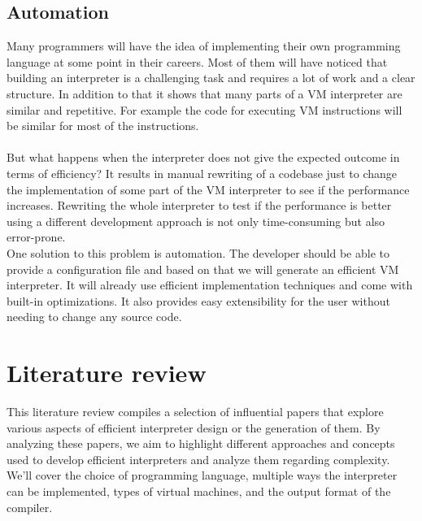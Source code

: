 \documentclass{article}
\begin{document}
\subsection{Automation}
Many programmers will have the idea of implementing their own programming
language at some point in their careers. Most of them will have noticed that
building an interpreter is a challenging task and requires a lot of work and a
clear structure. In addition to that it shows that many parts of a VM
interpreter are similar and repetitive. For example the code for executing VM
instructions will be similar for most of the instructions. ~\cite{vmgen}
\\ \\
But what happens when the interpreter does not give the expected outcome in
terms of efficiency? It results in manual rewriting of a codebase just to
change the implementation of some part of the VM interpreter to see if the
performance increases. Rewriting the whole interpreter to test if the
performance is better using a different development approach is not only
time-consuming but also error-prone.
\\
One solution to this problem is automation. The developer should be able to
provide a configuration file and based on that we will generate an efficient VM
interpreter. It will already use efficient implementation techniques and come
with built-in optimizations. It also provides easy extensibility for the user
without needing to change any source code.

\section{Literature review}
This literature review compiles a selection of influential papers that explore
various aspects of efficient interpreter design or the generation of them. By
analyzing these papers, we aim to highlight different approaches and concepts
used to develop efficient interpreters and analyze them regarding complexity.
We'll cover the choice of programming language, multiple ways the interpreter
can be implemented, types of virtual machines, and the output format of the
compiler.
\end{document}
